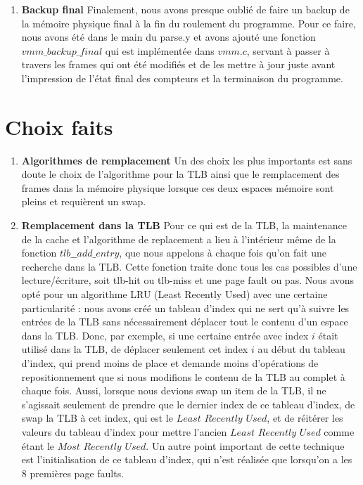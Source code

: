 \documentclass[12pt]{article}
\begin{document}
\begin{enumerate}
\item \textbf{Backup final}
\newline
Finalement, nous avons presque oublié de faire un backup de la mémoire physique final à la fin du roulement du programme. Pour ce faire, nous avons été dans le main du parse.y et avons ajouté une fonction $vmm\_backup\_final$ qui est implémentée dans $vmm.c$, servant à passer à travers les frames qui ont été modifiés et de les mettre à jour juste avant l'impression de l'état final des compteurs et la terminaison du programme.
\end{enumerate}

\section*{Choix faits}
\begin{enumerate}
\item \textbf{Algorithmes de remplacement}
\newline
Un des choix les plus importants est sans doute le choix de l'algorithme pour la TLB ainsi que le remplacement des frames dans la mémoire physique lorsque ces deux espaces mémoire sont pleins et requièrent un swap. 

\item \textbf{Remplacement dans la TLB}
\newline
Pour ce qui est de la TLB, la maintenance de la cache et l'algorithme de replacement a lieu à l'intérieur même de la fonction $tlb\_\_add\_entry$, que nous appelons à chaque fois qu'on fait une recherche dans la TLB. Cette fonction traite donc tous les cas possibles d'une lecture/écriture, soit tlb-hit ou tlb-miss et une page fault ou pas. Nous avons opté pour un algorithme LRU (Least Recently Used) avec une certaine particularité : nous avons créé un tableau d'index qui ne sert qu'à suivre les entrées de la TLB sans nécessairement déplacer tout le contenu d'un espace dans la TLB. Donc, par exemple, si une certaine entrée avec index $i$ était utilisé dans la TLB, de déplacer seulement cet index $i$ au début du tableau d'index, qui prend moins de place et demande moins d'opérations de repositionnement que si nous modifions le contenu de la TLB au complet à chaque fois. Aussi, lorsque nous devions swap un item de la TLB, il ne s'agissait seulement de prendre que le dernier index de ce tableau d'index, de swap la TLB à cet index, qui est le $Least$ $Recently$ $Used$, et de réitérer les valeurs du tableau d'index pour mettre l'ancien $Least$ $Recently$ $Used$ comme étant le $Most$ $Recently$ $Used$. Un autre point important de cette technique est l'initialisation de ce tableau d'index, qui n'est réalisée que lorsqu'on a les 8 premières page faults. 


\end{enumerate}
\end{document}
